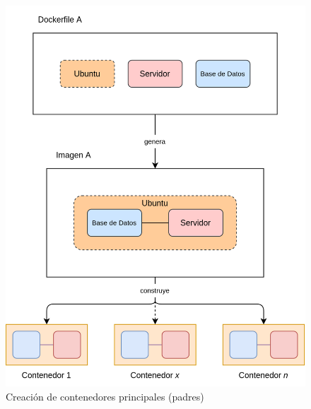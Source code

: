                 \begin{figure}[!htbp]
                    \centering
                    \includegraphics[scale=0.14]{images/Diagramas/Contenedor A.png}
                    \caption{Creación de contenedores principales (padres)}
                    \label{fig:contenedor-padre}
                \end{figure}
                
